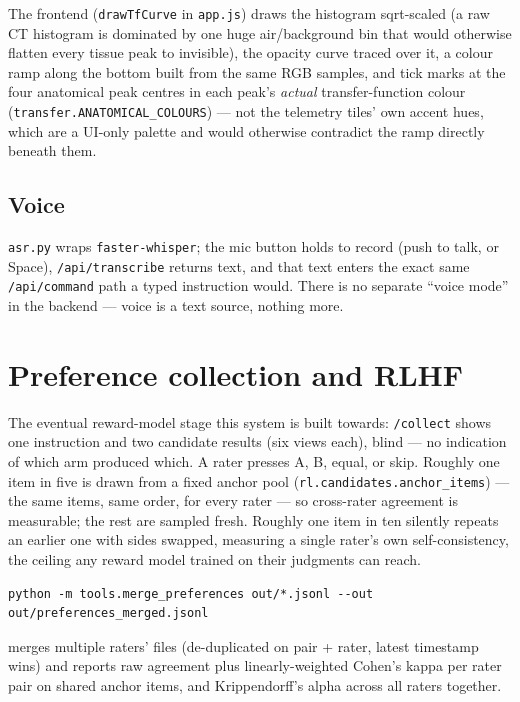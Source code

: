 \documentclass[10pt]{article}
\newcommand{\code}[1]{\texttt{#1}}
\begin{document}
The frontend (\code{drawTfCurve} in \code{app.js}) draws the histogram
sqrt-scaled (a raw CT histogram is dominated by one huge air/background bin
that would otherwise flatten every tissue peak to invisible), the opacity
curve traced over it, a colour ramp along the bottom built from the same RGB
samples, and tick marks at the four anatomical peak centres in each peak's
\emph{actual} transfer-function colour (\code{transfer.ANATOMICAL\_COLOURS})
--- not the telemetry tiles' own accent hues, which are a UI-only palette
and would otherwise contradict the ramp directly beneath them.

\subsection{Voice}

\code{asr.py} wraps \code{faster-whisper}; the mic button holds to record
(push to talk, or Space), \code{/api/transcribe} returns text, and that text
enters the exact same \code{/api/command} path a typed instruction would.
There is no separate ``voice mode'' in the backend --- voice is a text
source, nothing more.

\newpage
\section{Preference collection and RLHF}
\label{sec:preferences}

The eventual reward-model stage this system is built towards: \code{/collect}
shows one instruction and two candidate results (six views each), blind ---
no indication of which arm produced which. A rater presses A, B, equal, or
skip. Roughly one item in five is drawn from a fixed anchor pool
(\code{rl.candidates.anchor\_items}) --- the same items, same order, for
every rater --- so cross-rater agreement is measurable; the rest are sampled
fresh. Roughly one item in ten silently repeats an earlier one with sides
swapped, measuring a single rater's own self-consistency, the ceiling any
reward model trained on their judgments can reach.

\begin{lstlisting}
python -m tools.merge_preferences out/*.jsonl --out out/preferences_merged.jsonl
\end{lstlisting}

merges multiple raters' files (de-duplicated on pair + rater, latest
timestamp wins) and reports raw agreement plus linearly-weighted Cohen's
kappa per rater pair on shared anchor items, and Krippendorff's alpha across
all raters together.
\end{document}

